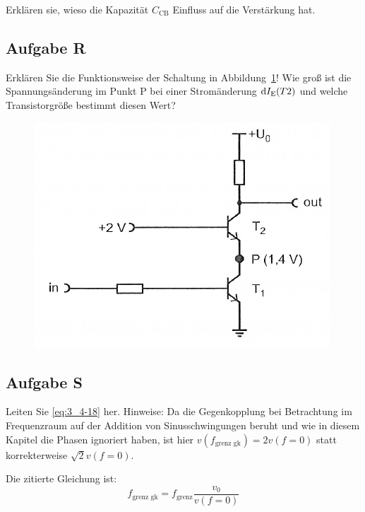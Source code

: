 \begin{problem}
	Erklären sie, wieso die Kapazität $C_\text{CB}$ Einfluss auf die
	Verstärkung hat.
\end{problem}

\fehlt

\FloatBarrier
\subsection{Aufgabe R}

\begin{problem}
	Erklären Sie die Funktionsweise der Schaltung in
	Abbildung~\ref{fig:3_4-15}! Wie groß ist die Spannungsänderung im Punkt P
	bei einer Stromänderung $\mathrm d I_\text{E}(T2)$ und welche
	Transistorgröße bestimmt diesen Wert?
\end{problem}

\begin{figure}[htbp]
	\centering
	\includegraphics[width=.6\textwidth]{Anleitung/3_4-15.png}
	\caption{%
		\cite[Abbildung~3/4.15]{physik313-Anleitung}
	}
	\label{fig:3_4-15}
\end{figure}

\fehlt

\FloatBarrier
\subsection{Aufgabe S}

\begin{problem}
	Leiten Sie \eqref{eq:3_4-18} her. Hinweise: Da die Gegenkopplung bei
	Betrachtung im Frequenzraum auf der Addition von Sinusschwingungen beruht
	und wie in diesem Kapitel die Phasen ignoriert haben, ist hier
	$v(f_\text{grenz gk}) = 2v(f=0)$ statt korrekterweise $\sqrt 2 v (f = 0)$.
\end{problem}

Die zitierte Gleichung ist:
\begin{equation}
	\label{eq:3_4-18}
	f_\text{grenz gk} = f_\text{grenz} \frac{v_0}{v(f=0)}
\end{equation}

